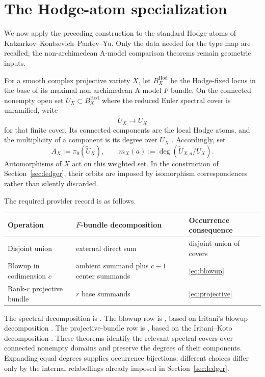 \section{The Hodge-atom specialization}
\label{sec:hodge}

We now apply the preceding construction to the standard Hodge atoms of
Katzarkov--Kontsevich--Pantev--Yu.  Only the data needed for the type map are
recalled; the non-archimedean A-model comparison theorems remain geometric
inputs.

For a smooth complex projective variety $X$, let $B_X^{\mathrm{Hod}}$ be
the Hodge-fixed locus in the base of its maximal non-archimedean A-model
$F$-bundle.  On the connected nonempty open set
$U_X\subset B_X^{\mathrm{Hod}}$ where the
reduced Euler spectral cover is unramified, write
\[
 \widetilde U_X\longrightarrow U_X
 \tag{3.1}\label{eq:hodge-cover}
\]
for that finite cover.  Its connected components are the local Hodge atoms,
and the multiplicity of a component is its degree over $U_X$
\cite[Definition~5.10 and Section~5.4]{KKPY}.  Accordingly, set
\[
 A_X:=\pi_0(\widetilde U_X),
 \qquad
 m_X(a):=\deg(\widetilde U_{X,a}/U_X).
 \tag{3.2}\label{eq:hodge-occurrences}
\]
Automorphisms of $X$ act on this weighted set.  In the construction of
Section~\ref{sec:ledger}, their orbits are imposed by isomorphism
correspondences rather than silently discarded.

The required provider record is as follows.
\begin{center}
\begin{tabular}{@{}>{\raggedright\arraybackslash}p{}
                    >{\raggedright\arraybackslash}p{}
                    >{\raggedright\arraybackslash}p{}@{}}
\toprule
Operation & $F$-bundle decomposition & Occurrence consequence \\
\midrule
Disjoint union & external direct sum & disjoint union of covers \\
Blowup in codimension $c$ & ambient summand plus $c-1$ center summands &
  \eqref{eq:blowup} \\
Rank-$r$ projective bundle & $r$ base summands &
  \eqref{eq:projective} \\
\bottomrule
\end{tabular}
\end{center}
The spectral decomposition is \cite[Theorem~4.1]{KKPY}.  The blowup row is
\cite[Theorem~4.5]{KKPY}, based on Iritani's blowup decomposition
\cite[Theorem~5.18]{Iritani}.  The projective-bundle row is
\cite[Theorem~4.11]{KKPY}, based on the Iritani--Koto decomposition
\cite[Theorem~5.1]{IritaniKoto}.  These theorems identify the relevant
spectral covers over connected nonempty domains and preserve the degrees of
their components.  Expanding equal degrees supplies occurrence bijections;
different choices differ only by the internal relabellings already imposed in
Section~\ref{sec:ledger}.

